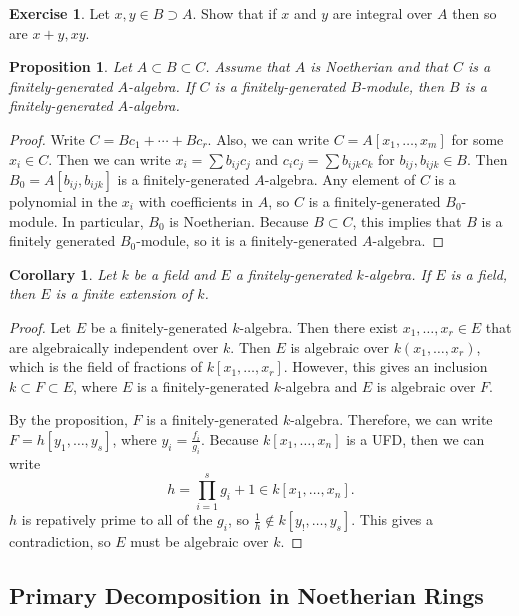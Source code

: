 \documentclass[leqno, openany]{memoir}
\newtheorem{cor}[thm]{Corollary}
\newtheorem{prop}[thm]{Proposition}
\theoremstyle{definition}
\newtheorem{exer}[thm]{Exercise}
\theoremstyle{remark}
\theoremstyle{plain}
\theoremstyle{definition}
\theoremstyle{remark}
\begin{document}
\begin{exer} Let $x,y \in B \supset A$. Show that if $x$ and $y$ are integral
over $A$ then so are $x+y,xy$.  \end{exer}

\begin{prop} Let $A \subset B \subset C$. Assume that $A$ is Noetherian and
that $C$ is a finitely-generated $A$-algebra. If $C$ is a finitely-generated
$B$-module, then $B$ is a finitely-generated $A$-algebra.  \end{prop}

\begin{proof} Write $C = B c_1 + \cdots + B c_r$. Also, we can write $C =
    A[x_1, \ldots, x_m]$ for some $x_i \in C$. Then we can write $x_i = \sum
    b_{ij} c_j$ and $c_ic_j = \sum b_{ijk} c_k$ for $b_{ij}, b_{ijk} \in B$.
    Then $B_0 = A[b_{ij}, b_{ijk}]$ is a finitely-generated $A$-algebra. Any
    element of $C$ is a polynomial in the $x_i$ with coefficients in $A$, so
    $C$ is a finitely-generated $B_0$-module. In particular, $B_0$ is
    Noetherian. Because $B \subset C$, this implies that $B$ is a finitely
    generated $B_0$-module, so it is a finitely-generated $A$-algebra.
\end{proof}

\begin{cor} Let $k$ be a field and $E$ a finitely-generated $k$-algebra. If $E$
is a field, then $E$ is a finite extension of $k$.  \end{cor}

\begin{proof} Let $E$ be a finitely-generated $k$-algebra. Then there exist
    $x_1, \ldots, x_r \in E$ that are algebraically independent over $k$. Then
    $E$ is algebraic over $k(x_1, \ldots, x_r)$, which is the field of
    fractions of $k[x_1, \ldots, x_r]$. However, this gives an inclusion $k
    \subset F \subset E$, where $E$ is a finitely-generated $k$-algebra and $E$
    is algebraic over $F$.

    By the proposition, $F$ is a finitely-generated $k$-algebra. Therefore, we
    can write $F = h[y_1, \ldots, y_s]$, where $y_i = \frac{f_i}{g_i}$. Because
    $k[x_1, \ldots, x_n]$ is a UFD, then we can write \[ h = \prod_{i=1}^s g_i
    + 1 \in k[x_1, \ldots, x_n]. \] $h$ is repatively prime to all of the
$g_i$, so $\frac{1}{h} \notin k[y_!, \ldots, y_s]$. This gives a contradiction,
so $E$ must be algebraic over $k$.  \end{proof}

\subsection{Primary Decomposition in Noetherian Rings}%
\label{sub:existence_of_}
\end{document}
